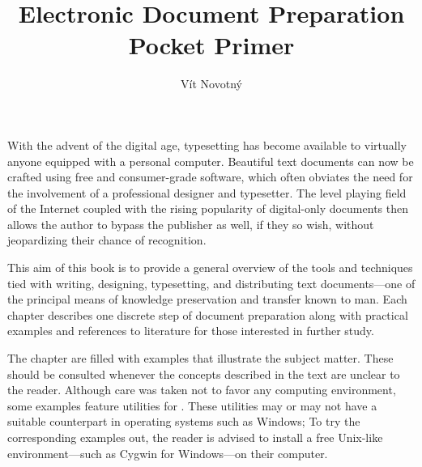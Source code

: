 \documentclass[
  a5paper,10pt,           %
  dvipsnames              %
]{book}
\begin{document}
\frontmatter
\title{Electronic Document Preparation\\Pocket Primer}
\author{Vít Novotný}
\maketitle
\tableofcontents
\mainmatter
{}
With the advent of the digital age, typesetting has become available to
virtually anyone equipped with a personal computer. Beautiful text documents can
now be crafted using free and consumer-grade software, which often obviates the
need for the involvement of a professional designer and typesetter. The level
playing field of the Internet coupled with the rising popularity of digital-only
documents then allows the author to bypass the publisher as well, if they so
wish, without jeopardizing their chance of recognition.

This aim of this book is to provide a general overview of the tools and
techniques tied with writing, designing, typesetting, and distributing text
documents---one of the principal means of knowledge preservation and transfer
known to man. Each chapter describes one discrete step of document preparation
along with practical examples and references to literature for those interested
in further study.

The chapter are filled with examples that illustrate the subject matter. These
should be consulted whenever the concepts described in the text are unclear to
the reader. Although care was taken not to favor any computing environment,
some examples feature utilities for \Unices. These utilities may or may not have
a suitable counterpart in operating systems such as Windows; To try the
corresponding examples out, the reader is advised to install a free Unix-like
environment---such as Cygwin for Windows---on their computer.






\backmatter

\def\cite#1{$\!$}                    %
\printbibliography[heading=bibintoc] %

\def\index#1{} %
\printacronyms[heading=none]

\cleardoublepage
\def\index#1{} %
\printindex    %
\end{document}
